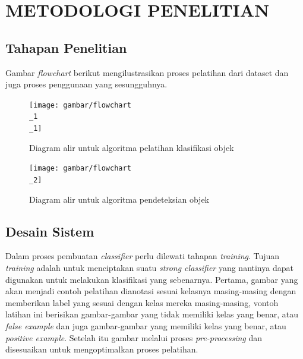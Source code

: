 
\chapter{METODOLOGI PENELITIAN}

\section{Tahapan Penelitian}

Gambar \textit{flowchart} berikut mengilustrasikan proses pelatihan 
 dari dataset dan juga proses penggunaan yang sesungguhnya.

\begin{figure}[H]
  \centering{}
	\texttt{[image: gambar/flowchart\\\_1\\\_1]}
  \caption{Diagram alir untuk algoritma pelatihan klasifikasi objek}
\end{figure}

\begin{figure}[H]
  \centering{}
	\texttt{[image: gambar/flowchart\\\_2]}
  \caption{Diagram alir untuk algoritma pendeteksian objek}
\end{figure}


\section{Desain Sistem}

Dalam proses pembuatan \emph{classifier} perlu dilewati tahapan \textit{training}. 
Tujuan \textit{training} adalah untuk menciptakan suatu \emph{strong classifier} 
yang nantinya dapat digunakan untuk melakukan klasifikasi yang sebenarnya.
Pertama, gambar yang akan menjadi contoh pelatihan dianotasi sesuai kelasnya masing-masing dengan 
memberikan label yang sesuai dengan kelas mereka masing-masing, 
vontoh latihan ini berisikan gambar-gambar yang tidak memiliki kelas yang benar, atau 
\emph{false example} dan juga gambar-gambar yang memiliki kelas yang benar, atau 
\emph{positive example}. Setelah itu gambar melalui proses \emph{pre-processing} dan disesuaikan 
untuk mengoptimalkan proses pelatihan.

